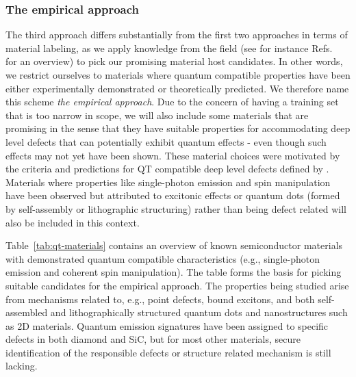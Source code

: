 \documentclass[superscriptaddress,unsortedaddress,
 amsmath,amssymb,
 aps,
]{revtex4-2}
\begin{document}
\subsubsection*{The empirical approach}
The third approach differs substantially from the first two approaches in terms of material labeling, as we apply knowledge from the field (see for instance Refs.~\cite{Atatuere2018,Zhang2020,Son2020,Toth2019,Bathen2021} for an overview) to pick our promising material host candidates.  
In other words, we restrict ourselves to materials where quantum compatible properties have been either experimentally demonstrated or theoretically predicted. 
We therefore name this scheme \emph{the empirical approach}. Due to the concern of having a training set that is too narrow in scope, we will also include some  materials that are promising in the sense that they have suitable properties for accommodating deep level defects that can potentially exhibit quantum effects - even though such effects may not yet have been shown. These material choices were motivated by the criteria and predictions for QT compatible deep level defects defined by \citeauthor{Weber2010} \cite{Weber2010}. 
Materials where properties like single-photon emission and spin manipulation have been observed but attributed to excitonic effects or quantum dots (formed by self-assembly or lithographic structuring) rather than being defect related will also be included in this context.  

Table~\ref{tab:qt-materials} contains an overview of known semiconductor materials with demonstrated quantum compatible characteristics (e.g., single-photon emission and coherent spin manipulation). The table forms the basis for picking suitable candidates for the empirical approach. The properties being studied arise from mechanisms related to, e.g., point defects, bound excitons, and both self-assembled and lithographically structured quantum dots and  nanostructures such as 2D materials. 
Quantum emission signatures have been assigned to specific defects in both diamond and SiC, but for most other materials, secure identification of the responsible defects or structure related mechanism is still lacking.  

\end{document}
